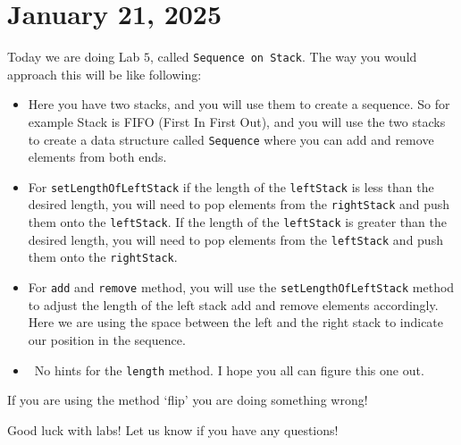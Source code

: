 \documentclass[11pt]{article}
\begin{document}
\section{January 21, 2025}
Today we are doing Lab \(5\), called \texttt{Sequence on Stack}. The way you
would approach this will be like following:
\begin{itemize}
    \item Here you have two stacks, and you will use them to create a sequence. So for
          example Stack is FIFO (First In First Out), and you will use the two stacks to
          create a data structure called \texttt{Sequence} where you can add and remove
          elements from both ends.
    \item For \texttt{setLengthOfLeftStack} if the length of the \texttt{leftStack} is
          less than the desired length, you will need to pop elements from the
          \texttt{rightStack} and push them onto the \texttt{leftStack}. If the length of
          the \texttt{leftStack} is greater than the desired length, you will need to pop
          elements from the \texttt{leftStack} and push them onto the
          \texttt{rightStack}.

    \item For \texttt{add} and \texttt{remove} method, you will use the \texttt{setLengthOfLeftStack} method to adjust the length of the left stack add and remove elements accordingly. Here we are using the space between the left and the right stack to indicate our position in the sequence. 
    \item\ No hints for the \texttt{length} method. I hope you all can figure this one out. 
\end{itemize}
\begin{fact}
    If you are using the method `flip' you are doing something wrong! 
\end{fact}
Good luck with labs! Let us know if you have any questions!
\end{document}
